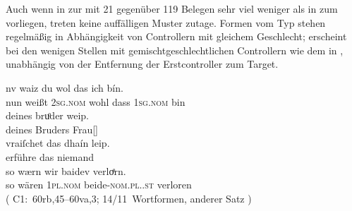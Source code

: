 Auch wenn in  zur \KC{} mit 21 gegenüber 119 Belegen
sehr viel weniger als in  zum \CAO{} vorliegen,
treten keine auffälligen Muster zutage. Formen vom Typ  stehen
regelmäßig in Abhängigkeit von Controllern mit gleichem Geschlecht;
 erscheint bei den wenigen Stellen mit gemischtgeschlechtlichen
Controllern wie dem in , unabhängig von der Entfernung der
Erstcontroller zum Target.

\begin{exe}
\ex \label{ex:combgenddist1}

		\gll nv waiz du wol das ich bín. \\
		     nun weißt \textsc{2sg\subM.nom} wohl dass \textsc{1sg\subF.nom} bin \\
	\sn \gll deines bruͦder weip. \\
	         deines Bruders Frau[\NeutF] \\
	\sn	\gll vraiſchet das {dhaín leip.} \\
		     erführe das niemand \\
	\sn \gll so wærn wir baidev verloͤrn. \\
		     so wären \textsc{1pl\subMF.nom} beide-\textsc{nom.pl.\NeutMF.st}
		     verloren \\
		\trans {}
			(%
				C1:~60rb,45--60va,3;
				14/11~Wortformen, anderer Satz%
			)

\end{exe}

